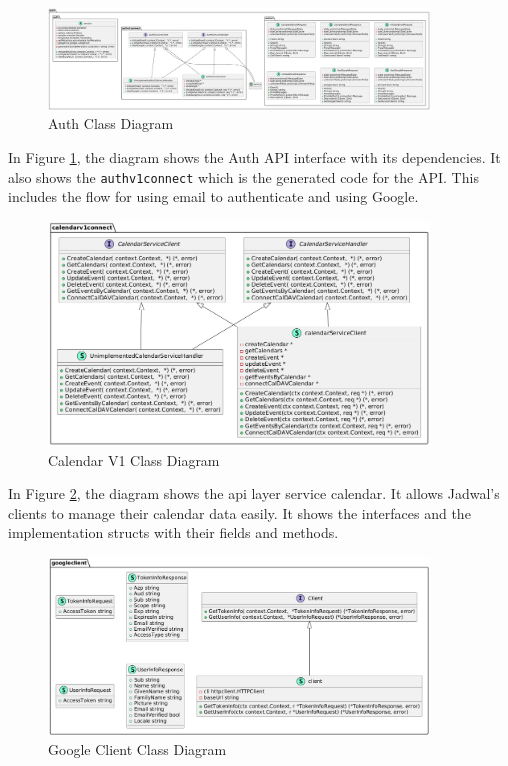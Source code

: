 \newpage

\begin{figure}[!h]
    \centering
    \includegraphics[width=0.9\textwidth]{images/docs/diagrams/class/class-diagram/auth.png}
    \caption{Auth Class Diagram}
    \label{fig:auth-class-diagram}
\end{figure}

In Figure \ref{fig:auth-class-diagram}, the diagram shows the Auth API interface with its dependencies. It also shows the \texttt{authv1connect} which is the generated code for the API. This includes the flow for using email to authenticate and using Google.

\newpage

\begin{figure}[!h]
    \centering
    \includegraphics[width=0.9\textwidth]{images/docs/diagrams/class/class-diagram/calendarv1.png}
    \caption{Calendar V1 Class Diagram}
    \label{fig:calendar-v1-class-diagram}
\end{figure}

In Figure \ref{fig:calendar-v1-class-diagram}, the diagram shows the api layer service calendar. It allows Jadwal's clients to manage their calendar data easily. It shows the interfaces and the implementation structs with their fields and methods.

\newpage

\begin{figure}[!h]
    \centering
    \includegraphics[width=0.9\textwidth]{images/docs/diagrams/class/class-diagram/googleclient.png}
    \caption{Google Client Class Diagram}
    \label{fig:googleclient-class-diagram}
\end{figure}

